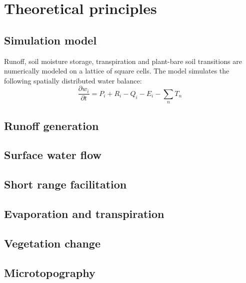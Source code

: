 \section{Theoretical principles}


\subsection{Simulation model}

Runoff, soil moisture storage, transpiration and plant-bare soil transitions
are numerically modeled on a lattice of square cells. The model simulates
the following spatially distributed water balance:
\begin{equation}
\frac{\partial w_{i}}{\partial t}=P_{i}+R_{i}-Q_{i}-E_{i}-\underset{n}{\sum}T_{n}\label{eq:water-balance}
\end{equation}




\subsection{Runoff generation}


\subsection{Surface water flow}


\subsection{Short range facilitation}


\subsection{Evaporation and transpiration}


\subsection{Vegetation change}


\subsection{Microtopography}


